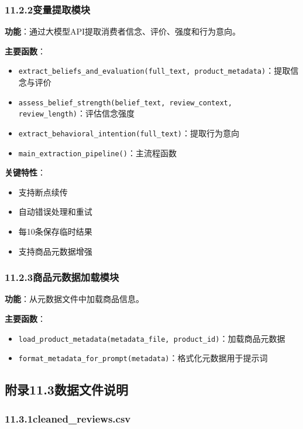 \subsubsection*{11.2.2\quad 变量提取模块}

\textbf{功能}：通过大模型API提取消费者信念、评价、强度和行为意向。

\textbf{主要函数}：
\begin{itemize}
  \item \texttt{extract\_beliefs\_and\_evaluation(full\_text, product\_metadata)}：提取信念与评价
  \item \texttt{assess\_belief\_strength(belief\_text, review\_context, review\_length)}：评估信念强度
  \item \texttt{extract\_behavioral\_intention(full\_text)}：提取行为意向
  \item \texttt{main\_extraction\_pipeline()}：主流程函数
\end{itemize}

\textbf{关键特性}：
\begin{itemize}
  \item 支持断点续传
  \item 自动错误处理和重试
  \item 每10条保存临时结果
  \item 支持商品元数据增强
\end{itemize}

\subsubsection*{11.2.3\quad 商品元数据加载模块}

\textbf{功能}：从元数据文件中加载商品信息。

\textbf{主要函数}：
\begin{itemize}
  \item \texttt{load\_product\_metadata(metadata\_file, product\_id)}：加载商品元数据
  \item \texttt{format\_metadata\_for\_prompt(metadata)}：格式化元数据用于提示词
\end{itemize}

\subsection*{附录11.3\quad 数据文件说明}

\subsubsection*{11.3.1\quad cleaned\_reviews.csv}

